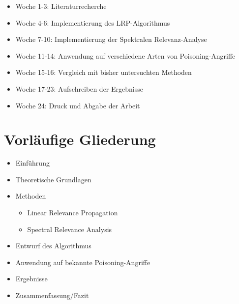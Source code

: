 \documentclass{article}
\theoremstyle{break}
\begin{document}
\begin{itemize}
	\item Woche 1-3: Literaturrecherche
	\item Woche 4-6: Implementierung des LRP-Algorithmus 
	\item Woche 7-10: Implementierung der Spektralen Relevanz-Analyse
	
	\item Woche 11-14: Anwendung auf verschiedene Arten von Poisoning-Angriffe
	
	\item Woche 15-16: Vergleich mit bisher untersuchten Methoden 
	\item Woche 17-23: Aufschreiben der Ergebnisse
	\item Woche 24: Druck und Abgabe der Arbeit
\end{itemize}
\newpage
\section{Vorläufige Gliederung}
\begin{itemize}
	\item Einführung
	\item Theoretische Grundlagen
	\item Methoden
		\begin{itemize}
			\item Linear Relevance Propagation
			\item Spectral Relevance Analysis
		\end{itemize}
	\item Entwurf des Algorithmus
	\item Anwendung auf bekannte Poisoning-Angriffe
	\item Ergebnisse
	\item Zusammenfassung/Fazit

	
\end{itemize}
\end{document}
